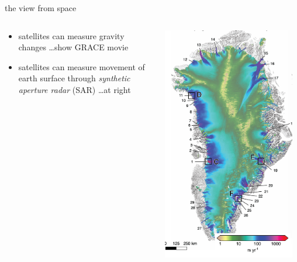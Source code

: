 \documentclass[hide notes,intlimits]{beamer}
\begin{document}

\begin{frame}{the view from space}

\begin{columns}
\begin{column}{0.6\textwidth}
\begin{itemize}
\item satellites can measure gravity changes \hfill \alert{\dots show GRACE movie}
\item satellites can measure movement of earth surface through \emph{synthetic aperture radar} (SAR) \hfill \alert{\dots at right}
\end{itemize}
\end{column}
\begin{column}{0.4\textwidth}

\hfill \includegraphics[width=0.95\textwidth]{greenland-overview-obsonly}
\end{column}
\end{columns}
\end{frame}
\end{document}
